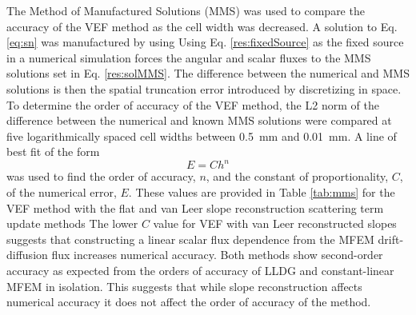 The Method of Manufactured Solutions (MMS) was used to compare the accuracy of the VEF method as the cell width was decreased. A solution to Eq. \ref{eq:sn} was manufactured by using 
Using Eq. \ref{res:fixedSource} as the fixed source in a numerical simulation forces the angular and scalar fluxes to the MMS solutions set in Eq. \ref{res:solMMS}. The difference between the numerical and MMS solutions is then the spatial truncation error introduced by discretizing in space. To determine the order of accuracy of the VEF method, the L2 norm of the difference between the numerical and known MMS solutions were compared at five logarithmically spaced cell widths between \SI{0.5}{mm} and \SI{0.01}{mm}. A line of best fit of the form 
	\begin{equation}
		E = C h^n
	\end{equation}
was used to find the order of accuracy, $n$, and the constant of proportionality, $C$, of the numerical error, $E$. These values are provided in Table \ref{tab:mms} for the VEF method with the flat and van Leer slope reconstruction scattering term update methods  The lower $C$ value for VEF with van Leer reconstructed slopes suggests that constructing a linear scalar flux dependence from the MFEM drift-diffusion flux increases numerical accuracy. Both methods show second-order accuracy as expected from the orders of accuracy of LLDG and constant-linear MFEM in isolation. This suggests that while slope reconstruction affects numerical accuracy it does not affect the order of accuracy of the method. 
